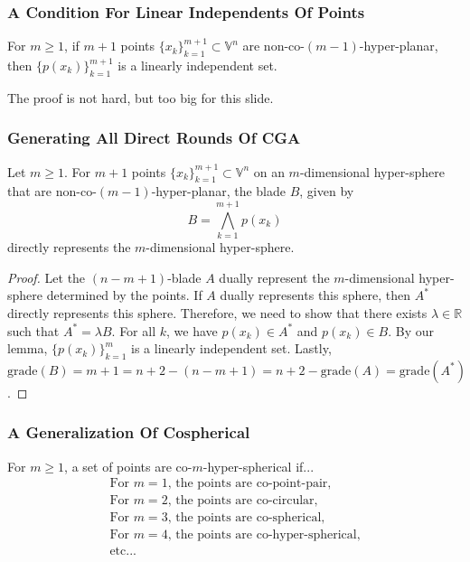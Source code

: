 \documentclass{beamer}
\newcommand{\V}{\mathbb{V}}
\newcommand{\R}{\mathbb{R}}
\newcommand{\grade}{\mbox{grade}}
\begin{document}
\begin{frame}
\frametitle{A Condition For Linear Independents Of Points}
\begin{lemma}
For $m\geq 1$, if $m+1$ points $\{x_k\}_{k=1}^{m+1}\subset\V^n$ are non-co-$(m-1)$-hyper-planar,
then $\{p(x_k)\}_{k=1}^{m+1}$ is a linearly independent set.
\end{lemma}\pause
The proof is not hard, but too big for this slide.
\end{frame}

\begin{frame}
\frametitle{Generating All \alert{Direct Rounds} Of CGA}
Let $m\geq 1$.
For $m+1$ points $\{x_k\}_{k=1}^{m+1}\subset\V^n$ on an $m$-dimensional
hyper-sphere that are non-co-$(m-1)$-hyper-planar,
the blade $B$, given by
\begin{equation*}
B = \bigwedge_{k=1}^{m+1} p(x_k)
\end{equation*}
\alert{directly} represents the $m$-dimensional hyper-sphere.\pause
\begin{proof}
Let the $(n-m+1)$-blade $A$ \alert{dually} represent the $m$-dimensional hyper-sphere determined by the points.
If $A$ \alert{dually} represents this sphere, then $A^*$ \alert{directly} represents this sphere.
Therefore, we need to show that there exists $\lambda\in\R$ such that $A^*=\lambda B$.
For all $k$, we have $p(x_k)\in A^*$ and $p(x_k)\in B$.
By our lemma, $\{p(x_k)\}_{k=1}^m$ is a linearly independent set.
Lastly, $\grade(B) = m+1 = n+2-(n-m+1) = n+2-\grade(A) = \grade(A^*)$.
\end{proof}
\end{frame}

\begin{frame}
\frametitle{A Generalization Of Cospherical}
\begin{definition}
For $m\geq 1$, a set of points are \alert{co-$m$-hyper-spherical} if...
\begin{equation*}
\begin{array}{l}
\mbox{For $m=1$, the points are co-point-pair,} \\
\mbox{For $m=2$, the points are co-circular,} \\
\mbox{For $m=3$, the points are co-spherical,} \\
\mbox{For $m=4$, the points are co-hyper-spherical,} \\
\mbox{etc...}
\end{array}
\end{equation*}
\end{definition}
\end{frame}
\end{document}
